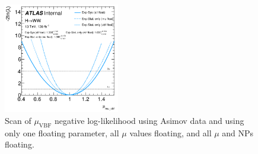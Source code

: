\begin{figure}[!h]
\centering
\includegraphics[width=0.45\textwidth]{Pictures/fitresults/afterfit.png}
\caption{Scan of $\mu_{\text{VBF}}$ negative log-likelihood using Asimov data and using only one floating parameter, all $\mu$ values floating, and all $\mu$ and NPs floating.}
\label{fig:scan}
\end{figure}

